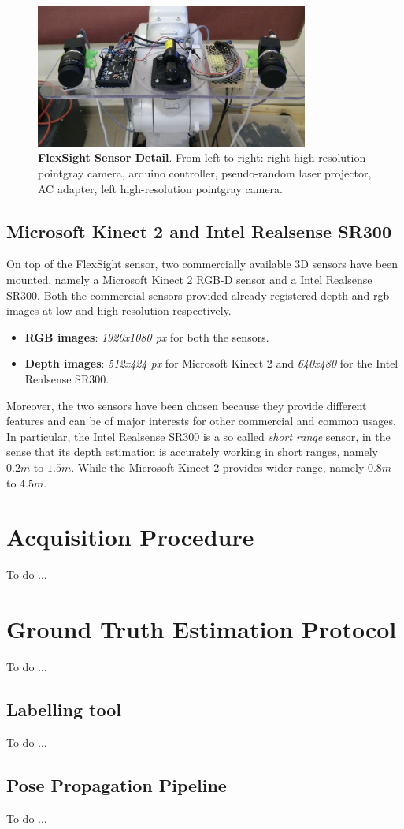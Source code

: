\begin{figure}
    \centering
    \includegraphics[width=0.8\textwidth]{figures/3_raw_dataset/fs_sensor_0}
    \caption{\textbf{FlexSight Sensor Detail}. From left to right: right high-resolution pointgray camera, arduino controller, pseudo-random laser projector, AC adapter, left high-resolution pointgray camera.}
    \label{fig:fs_sensor_0}
\end{figure}

\subsection{Microsoft Kinect 2 and Intel Realsense SR300}\label{subsec:raw_setup_kin&realsense}
On top of the FlexSight sensor, two commercially available 3D sensors have been mounted, namely a Microsoft Kinect 2 RGB-D sensor and a Intel Realsense SR300. Both the commercial sensors provided already registered depth and rgb images at low and high resolution respectively.

\begin{itemize}
	\item \textbf{RGB images}: \emph{1920x1080 px} for both the sensors.
	\item \textbf{Depth images}: \emph{512x424 px} for Microsoft Kinect 2 and \emph{640x480} for the Intel Realsense SR300.
\end{itemize}

Moreover, the two sensors have been chosen because they provide different features and can be of major interests for other commercial and common usages. In particular, the Intel Realsense SR300 is a so called \emph{short range} sensor, in the sense that its depth estimation is accurately working in short ranges, namely $0.2m$ to $1.5m$. While the Microsoft Kinect 2 provides wider range, namely $0.8m$ to $4.5m$.

\section{Acquisition Procedure}\label{sec:raw_acquisition_procedure}
To do ...

\section{Ground Truth Estimation Protocol}\label{sec:ground_truth_estim}
To do ...

\subsection{Labelling tool}\label{subsec:raw_labeltool}
To do ...

\subsection{Pose Propagation Pipeline}\label{subsec:pose_propagation}
To do ...